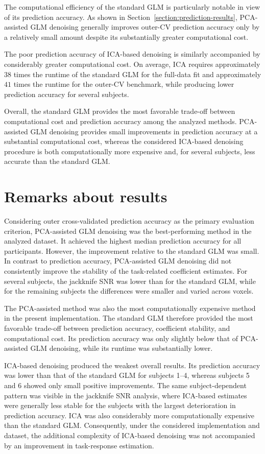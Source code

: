 \documentclass[english]{pwr_wmat_praca_dyplomowa}
\theoremstyle{definition}
\theoremstyle{remark}
\begin{document}
The computational efficiency of the standard GLM is particularly notable in view of its prediction accuracy. As shown in Section~\ref{section:prediction-results}, PCA-assisted GLM denoising generally improves outer-CV prediction accuracy only by a relatively small amount despite its substantially greater computational cost.

The poor prediction accuracy of ICA-based denoising is similarly accompanied by considerably greater computational cost. On average, ICA requires approximately $38$ times the runtime of the standard GLM for the full-data fit and approximately $41$ times the runtime for the outer-CV benchmark, while producing lower prediction accuracy for several subjects.

Overall, the standard GLM provides the most favorable trade-off between computational cost and prediction accuracy among the analyzed methods. PCA-assisted GLM denoising provides small improvements in prediction accuracy at a substantial computational cost, whereas the considered ICA-based denoising procedure is both computationally more expensive and, for several subjects, less accurate than the standard GLM.


\section{Remarks about results}
\label{section:results-remarks}

Considering outer cross-validated prediction accuracy as the primary evaluation criterion, PCA-assisted GLM denoising was the best-performing method in the analyzed dataset. It achieved the highest median prediction accuracy for all participants. However, the improvement relative to the standard GLM was small. In contrast to prediction accuracy, PCA-assisted GLM denoising did not consistently improve the stability of the task-related coefficient estimates. For several subjects, the jackknife SNR was lower than for the standard GLM, while for the remaining subjects the differences were smaller and varied across voxels. 

The PCA-assisted method was also the most computationally expensive method in the present implementation. The standard GLM therefore provided the most favorable trade-off between prediction accuracy, coefficient stability, and computational cost. Its prediction accuracy was only slightly below that of PCA-assisted GLM denoising, while its runtime was substantially lower.

ICA-based denoising produced the weakest overall results. Its prediction accuracy was lower than that of the standard GLM for subjects 1–4, whereas subjects 5 and 6 showed only small positive improvements. The same subject-dependent pattern was visible in the jackknife SNR analysis, where ICA-based estimates were generally less stable for the subjects with the largest deterioration in prediction accuracy. ICA was also considerably more computationally expensive than the standard GLM. Consequently, under the considered implementation and dataset, the additional complexity of ICA-based denoising was not accompanied by an improvement in task-response estimation.
\end{document}
